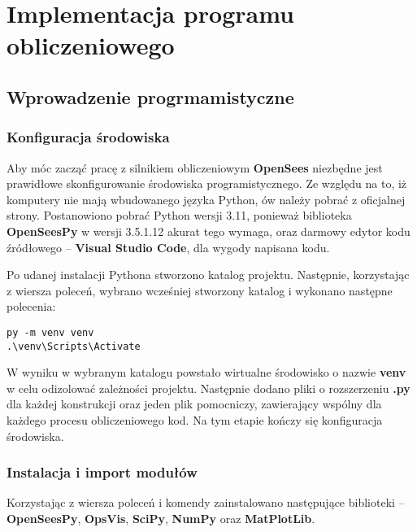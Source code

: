\section{Implementacja programu obliczeniowego}

\subsection{Wprowadzenie progrmamistyczne}

\subsubsection{Konfiguracja środowiska}

Aby móc zacząć pracę z silnikiem obliczeniowym \textbf{OpenSees} niezbędne jest prawidłowe skonfigurowanie środowiska programistycznego.
Ze względu na to, iż komputery nie mają wbudowanego języka Python, ów należy pobrać z oficjalnej strony\cite{python}.
Postanowiono pobrać Python wersji 3.11, ponieważ biblioteka \textbf{OpenSeesPy} w wersji 3.5.1.12 akurat tego wymaga,
oraz darmowy edytor kodu źródłowego – \textbf{Visual Studio Code}, dla wygody napisana kodu.

Po udanej instalacji Pythona stworzono katalog projektu.
Następnie, korzystając z wiersza poleceń, wybrano wcześniej stworzony katalog i wykonano następne polecenia:

\begin{lstlisting}
py -m venv venv
.\venv\Scripts\Activate
\end{lstlisting}

W wyniku w wybranym katalogu powstało wirtualne środowisko o nazwie \textbf{venv} w celu odizolować zależności projektu.
Następnie dodano pliki o rozszerzeniu \textbf{.py} dla każdej konstrukcji oraz jeden plik pomocniczy, zawierający wspólny
dla każdego procesu obliczeniowego kod.
Na tym etapie kończy się konfiguracja środowiska.

\subsubsection{Instalacja i import modułów}

Korzystając z wiersza poleceń i komendy  zainstalowano następujące biblioteki –
\textbf{OpenSeesPy}\cite{openseespy}, \textbf{OpsVis}\cite{opsvis}, \textbf{SciPy}\cite{scipy}, \textbf{NumPy}\cite{numpy} oraz \textbf{MatPlotLib}\cite{matplotlib}.

